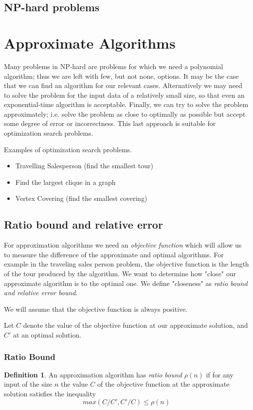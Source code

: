 \documentclass{article}
\theoremstyle{definition}
\newtheorem{definition}{Definition}[section]
\begin{document}
\subsection{NP-hard problems}



\section{Approximate Algorithms}
Many problems in NP-hard are problems for which we need a polynomial algorithm;
thus we are left with few, but not none, options.
It may be the case that we can find an algorithm for our relevant cases.
Alternatively we may need to solve the problem for the input
data of a relatively small size, so that even an exponential-time algorithm is acceptable.
Finally, we can try to solve the problem approximately;
i.e. solve the problem as close to optimally as possible but accept some degree of error
or incorrectness.
This last approach is suitable for optimization search problems.

Examples of optimization search problems.
\begin{itemize}
    \item Travelling Salesperson (find the smallest tour)
    \item Find the largest clique in a graph
    \item Vertex Covering (find the smallest covering)
\end{itemize}

\subsection{Ratio bound and relative error}
For approximation algorithms we need an \textit{objective function}
which will allow us to measure the difference of the approximate and optimal algorithms.
For example in the traveling sales person problem,
the objective function is the length of the tour produced by the algorithm.
We want to determine how "close" our approximate algorithm is to the
optimal one.  We define "closeness" as \textit{ratio bound and relative error bound}.

We will assume that the objective function is always positive.

Let $C$ denote the value of the objective function at our approximate solution,
and $C\prime$ at an optimal solution.

\subsubsection{Ratio Bound}
\begin{definition}
    An approximation algorithm has \textit{ratio bound $\rho(n)$}
    if for any input of the size $n$ the value $C$ of the objective function
    at the approximate solution satisfies the inequality
    $$
    max(C/C\prime, C\prime/C) \leq \rho(n)
    $$
\end{definition}
\end{document}
